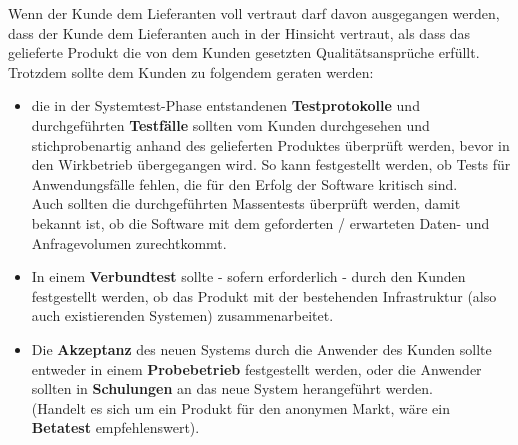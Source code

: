 
Wenn der Kunde dem Lieferanten voll vertraut darf davon ausgegangen werden, dass der Kunde dem Lieferanten auch in der Hinsicht vertraut, als dass das gelieferte Produkt die von dem Kunden gesetzten Qualitätsansprüche erfüllt.\\
Trotzdem sollte dem Kunden zu folgendem geraten werden:
\begin{itemize}
    \item die in der Systemtest-Phase entstandenen \textbf{Testprotokolle} und durchgeführten \textbf{Testfälle} sollten vom Kunden durchgesehen und stichprobenartig anhand des gelieferten Produktes überprüft werden, bevor in den Wirkbetrieb übergegangen wird.
    So kann festgestellt werden, ob Tests für Anwendungsfälle fehlen, die für den Erfolg der Software kritisch sind.\\
    Auch sollten die durchgeführten Massentests überprüft werden, damit bekannt ist, ob die Software mit dem geforderten / erwarteten Daten- und Anfragevolumen zurechtkommt.
    \item In einem \textbf{Verbundtest} sollte - sofern erforderlich - durch den Kunden  festgestellt werden, ob das Produkt mit der bestehenden Infrastruktur (also auch existierenden Systemen) zusammenarbeitet.
    \item Die \textbf{Akzeptanz} des neuen Systems durch die Anwender des Kunden sollte entweder in einem \textbf{Probebetrieb} festgestellt werden, oder die Anwender sollten in \textbf{Schulungen} an das neue System herangeführt werden.\\
    (Handelt es sich um ein Produkt für den anonymen Markt, wäre ein \textbf{Betatest} empfehlenswert).
\end{itemize}